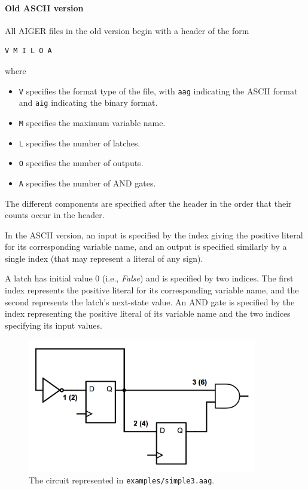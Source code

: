 \documentclass[12pt,a4paper,twoside,openright]{report}
\begin{document}
{{\paragraph{Old ASCII version}{
All AIGER files in the old version begin with a header of the form
\begin{verbatim}
V M I L O A
\end{verbatim}
where
\begin{itemize}
\item \verb,V, specifies the format type of the file, with \verb,aag, indicating the ASCII format and \verb,aig,
indicating the binary format.
\item \verb,M, specifies the maximum variable name.
\item \verb,L, specifies the number of latches.
\item \verb,O, specifies the number of outputs.
\item \verb,A, specifies the number of AND gates.
\end{itemize}

The different components are specified after the header
in the order that their counts occur in the header.

In the ASCII version, an input is specified by the
index giving the positive literal for its corresponding variable name,
and an output is specified similarly by a single index (that may represent
a literal of any sign).

A latch has initial value 0 (i.e., {\it False}) and is specified by two indices.
The first index represents the positive literal for its corresponding variable name,
and the second represents the latch's next-state value.
An AND gate
is specified by the index representing the positive literal
of its variable name and the two indices specifying its input values.

\begin{figure}[t]
\centering
\includegraphics[width=100mm]{circuit.png}
\caption{The circuit represented in {\tt examples/simple3.aag}.}
\label{aagCircuit}
\end{figure}

}}}
\end{document}
